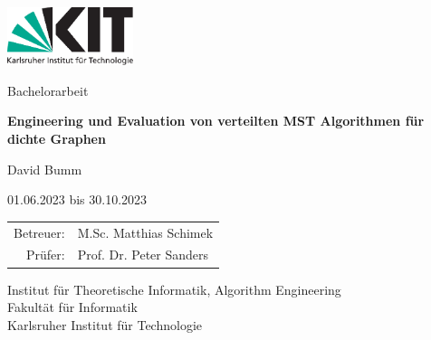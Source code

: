 \documentclass[12pt,a4paper,twoside,bibliography=totocnumbered]{scrartcl}
\numberwithin{equation}{section}
\begin{document}


\begin{titlepage}

  \begin{center}\large

    \quad\includegraphics[height=17mm]{images/kit_logo_de.pdf} \hfill
    \quad\null

    \vfill

    Bachelorarbeit
    \vspace*{2cm}

    {\textbf{\huge Engineering und Evaluation von verteilten MST Algorithmen für dichte Graphen} \par}

    \vfill

    David Bumm

    \vspace*{15mm}

    01.06.2023 bis 30.10.2023

    \vspace*{45mm}

    \begin{tabular}{rl}
      Betreuer: & M.Sc. Matthias Schimek \\
       Prüfer: & Prof. Dr. Peter Sanders \\
    \end{tabular}
    
    \vspace*{10mm}

    Institut für Theoretische Informatik, Algorithm Engineering \\
    Fakultät für Informatik \\
    Karlsruher Institut für Technologie

    \vspace*{12mm}
  \end{center}

\end{titlepage}
\end{document}
